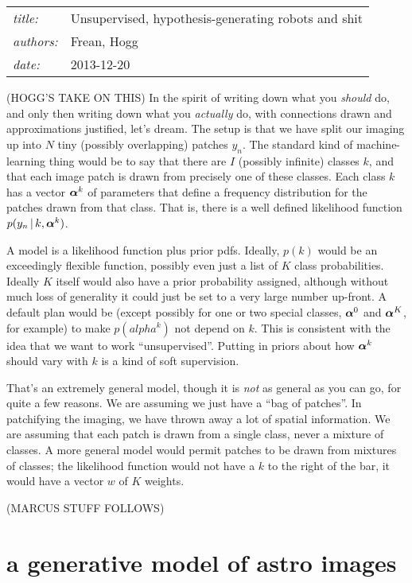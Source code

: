 \documentclass[12pt]{article}
\newcommand{\given}{\,|\,}
\newcommand{\balpha}{\mbox{\boldmath $\alpha$}}
\begin{document}
\sloppy\sloppypar

\noindent
\begin{tabular}{ll}
\textsl{title:} & Unsupervised, hypothesis-generating robots and shit \\
\textsl{authors:} & Frean, Hogg \\
\textsl{date:}    & 2013-12-20
\end{tabular}
\bigskip

(HOGG'S TAKE ON THIS)
In the spirit of writing down what you \emph{should} do,
  and only then writing down what you \emph{actually} do,
  with connections drawn and approximations justified,
  let's dream.
The setup is that we have split our imaging up into $N$ tiny
  (possibly overlapping) patches $y_n$.
The standard kind of machine-learning thing would be to
  say that there are $I$ (possibly infinite) classes $k$,
  and that each image patch is drawn from precisely one of these classes.
Each class $k$ has a vector $\balpha^k$ of parameters
  that define a frequency distribution
  for the patches drawn from that class.
That is, there is a well defined likelihood function $p(y_n\given k, \balpha^k)$.

A model is a likelihood function plus prior pdfs.
Ideally, $p(k)$ would be an exceedingly flexible function,
  possibly even just a list of $K$ class probabilities.
Ideally $K$ itself would also have a prior probability assigned,
  although without much loss of generality
  it could just be set to a very large number up-front.
A default plan would be 
  (except possibly for one or two special classes,
   $\balpha^0$ and $\balpha^K$, for example)
  to make $p(alpha^k)$ not depend on $k$.
This is consistent with the idea that we want to work ``unsupervised''.
Putting in priors about how $\balpha^k$ should vary with $k$ is a kind of soft supervision.

That's an extremely general model,
  though it is \emph{not} as general as you can go,
  for quite a few reasons.
We are assuming we just have a ``bag of patches''.
In patchifying the imaging, we have thrown away a lot of spatial information.
We are assuming that each patch is drawn from a single class,
  never a mixture of classes.
A more general model would permit patches to be drawn from mixtures of classes;
  the likelihood function would not have a $k$ to the right of the bar,
  it would have a vector $w$ of $K$ weights.

(MARCUS STUFF FOLLOWS)

\section{a generative model of astro images}
\end{document}
